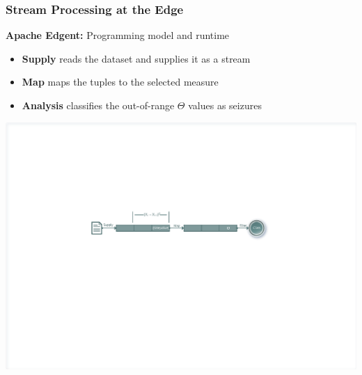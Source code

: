 \documentclass[xelatex,usenames,dvipsnames]{beamer}
\begin{document}
  \begin{frame}
    \frametitle{Stream Processing at the Edge}
    \textbf{Apache Edgent:} Programming model and runtime

    \begin{itemize}
      \item \textbf{Supply} reads the dataset and supplies it as a stream
      \item \textbf{Map} maps the tuples to the selected measure
      \item \textbf{Analysis} classifies the out-of-range \(\Theta\) values
      as seizures
    \end{itemize}

    \includegraphics[width = \textwidth]{figs/Edgent_pipeline.pdf}
    
  \end{frame}
\end{document}
